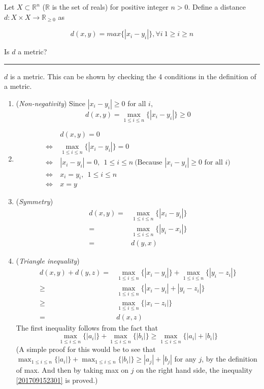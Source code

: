 \documentclass[a4paper,11pt]{article}
\newcommand{\sep}{\begin{center}\textcolor{gray}{\rule{\textwidth}{0.75pt}}\end{center}}
\begin{document}
Let $X \subset \mathbb{R}^n$  ($\mathbb{R}$ is the set of reals) for positive integer  $n>0$. Define a  distance $d: X \times X \rightarrow  \mathbb{R}_{\geq 0} $ as

\begin{equation*}
d(x,y) =  max\{|x_i - y_i|\}, \forall i\ 1\geq i \geq n
\end{equation*}

Is $d$ a metric?
\sep 

$d$ is a metric.
This can be shown by checking the 4 conditions in the definition of a metric.
\begin{enumerate}
    \item (\emph{Non-negativity}) Since $|x_i - y_i|\ge 0$ for all $i$, 
    \[
        d(x,y) = \max_{1\le i\le n}\{|x_i-y_i|\} \ge 0
    \]
    
    \item 
    \[\begin{aligned}
        &\ d(x, y) = 0 \\
        \Leftrightarrow&\ 
        \max_{1\le i\le n}\{|x_i-y_i|\} = 0\\
        \Leftrightarrow&\
        |x_i-y_i| = 0,\ \ 
        1\le i \le n\ \text{(Because $|x_i-y_i| \ge 0$ for all $i$)}\\
        \Leftrightarrow&\
        x_i = y_i,\ \ 
        1\le i \le n\ \\
        \Leftrightarrow&\ 
        x=y
    \end{aligned}\]
    
    \item (\emph{Symmetry})
    \[\begin{aligned}
        d(x,y) 
        =& \max_{1\le i\le n}\{|x_i-y_i|\}\\
        =& \max_{1\le i\le n}\{|y_i-x_i|\}\\
        =& d(y,x) 
    \end{aligned}\]
    
    
    \item (\emph{Triangle inequality})
    \begin{equation}\begin{aligned}
        d(x,y) + d(y,z) 
        =& \max_{1\le i\le n}\{|x_i-y_i|\} 
        + \max_{1\le i\le n}\{|y_i-z_i|\} \\
        \ge& \max_{1\le i\le n}\{|x_i-y_i|+|y_i-z_i|\}\\
        \ge& \max_{1\le i\le n}\{|x_i-z_i|\}\\
        =& d(x,z) 
        \label{201709152303}
    \end{aligned}\end{equation}
    The first inequality follows from the fact that
    \begin{equation}
        \max_{1\le i\le n}\{|a_i|\} + \max_{1\le i\le n}\{|b_i|\}
        \ge 
        \max_{1\le i\le n}\{|a_i| + |b_i|\}
        \label{201709152301}
    \end{equation}
    (A simple proof for this would be to see that $\max_{1\le i\le n}\{|a_i|\} + \max_{1\le i\le n}\{|b_i|\}\ge |a_j| + |b_j|$ for any $j$, by the definition of max. And then by taking max on $j$ on the right hand side, the inequality \eqref{201709152301} is proved.)
    

\end{enumerate}
\end{document}
